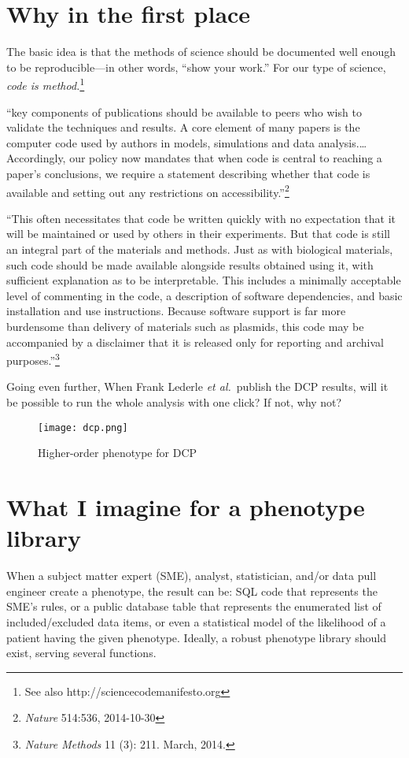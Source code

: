 \documentclass{tufte-handout}
\begin{document}
\section{Why in the first place}

The basic idea is that the methods of science should be documented
well enough to be reproducible---in other words, ``show your work.''
For our type of science, \emph{code is method.}\footnote{See also
http://sciencecodemanifesto.org}

``key components of publications should be available to peers who wish
to validate the techniques and results. A core element of many papers
is the computer code used by authors in models, simulations and data
analysis.\ldots{} Accordingly, our policy now mandates that when code
is central to reaching a paper's conclusions, we require a statement
describing whether that code is available and setting out any
restrictions on accessibility.''\footnote{\emph{Nature} 514:536,
  2014-10-30}

``This often necessitates that code be written quickly with no
expectation that it will be maintained or used by others in their
experiments. But that code is still an integral part of the materials
and methods. Just as with biological materials, such code should be
made available alongside results obtained using it, with sufficient
explanation as to be interpretable. This includes a minimally
acceptable level of commenting in the code, a description of software
dependencies, and basic installation and use instructions. Because
software support is far more burdensome than delivery of materials
such as plasmids, this code may be accompanied by a disclaimer that it
is released only for reporting and archival
purposes.''\footnote{\emph{Nature Methods} 11 (3): 211. March, 2014.}

Going even further, When Frank Lederle \emph{et al.}\ publish the DCP
results, will it be possible to run the whole analysis with one click?
If not, why not?

\begin{figure}
\texttt{[image: dcp.png]}
\caption{Higher-order phenotype for DCP}
\label{dcpgraph}
\end{figure}

\section{What I imagine for a phenotype library}

When a subject matter expert (SME), analyst, statistician, and/or data
pull engineer create a phenotype, the result can be: SQL code that
represents the SME's rules, or a public database table that represents
the enumerated list of included/excluded data items, or even a
statistical model of the likelihood of a patient having the given
phenotype. Ideally, a robust phenotype library should exist, serving
several functions.
\end{document}
